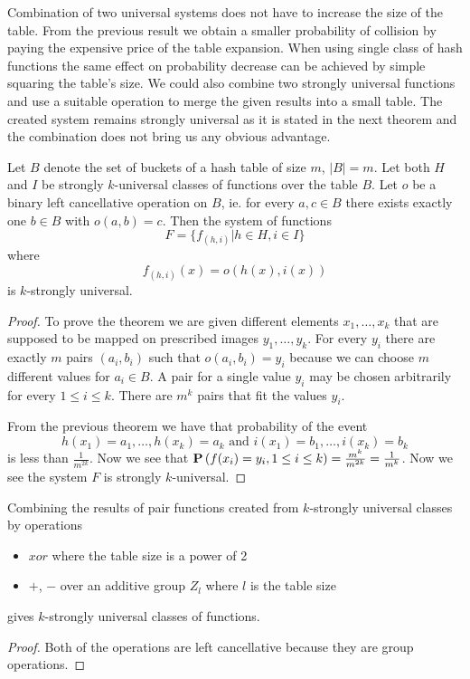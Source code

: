 Combination of two universal systems does not have to increase the size of the table. From the previous result we obtain a smaller probability of collision by paying the expensive price of the table expansion. When using single class of hash functions the same effect on probability decrease can be achieved by simple squaring the table's size. We could also combine two strongly universal functions and use a suitable operation to merge the given results into a small table. The created system remains strongly universal as it is stated in the next theorem and the combination does not bring us any obvious advantage.

\begin{theorem}
Let $B$ denote the set of buckets of a hash table of size $m$, $|B| = m$. Let both $H$ and $I$ be strongly $k$-universal classes of functions over the table $B$. Let $o$ be a binary left cancellative operation on $B$, ie. for every $a, c \in B$ there exists exactly one $b \in B$ with $o(a, b) = c$. Then the system of functions \[F = \lbrace f_{(h, i)} | h \in H, i \in I \rbrace\] where \[f_{(h, i)}(x) = o(h(x), i(x))\] is $k$-strongly universal.
\end{theorem}
\begin{proof}
To prove the theorem we are given different elements $x_1, \dots, x_k$ that are supposed to be mapped on prescribed images $y_1, \dots, y_k$. For every $y_i$ there are exactly $m$ pairs $(a_i, b_i)$ such that $o(a_i, b_i) = y_i$ because we can choose $m$ different values for $a_i \in B$. A pair for a single value $y_i$ may be chosen arbitrarily for every $1 \le i \le k$. There are $m^k$ pairs that fit the values $y_i$.

From the previous theorem we have that probability of the event \[ h(x_1) = a_1, \dots, h(x_k) = a_k \text{ and } i(x_1) = b_1, \dots, i(x_k) = b_k \] is less than $\frac{1}{m^{2k}}$. Now we see that $\mathbf{P}\left(f(x_i\right) = y_i, 1 \le i \le k) = \frac{m^k}{m^{2k}} = \frac{1}{m^k}$. Now we see the system $F$ is strongly $k$-universal.
\end{proof}

\begin{corollary}
Combining the results of pair functions created from $k$-strongly universal classes by operations
\begin{itemize}
\item $xor$ where the table size is a power of 2
\item $+$, $-$ over an additive group $Z_l$ where $l$ is the table size
\end{itemize}
gives $k$-strongly universal classes of functions.
\end{corollary}
\begin{proof}
Both of the operations are left cancellative because they are group operations.
\end{proof}

